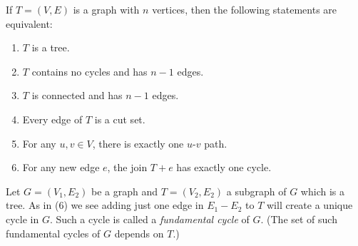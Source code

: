 \begin{theorem}
If $T = (V, E)$ is a graph with $n$ vertices, then the following
statements are equivalent:
\begin{enumerate}
\item $T$ is a tree.

\item $T$ contains no cycles and has $n - 1$ edges.

\item $T$ is connected and has $n - 1$ edges.

\item Every edge of $T$ is a cut set.

\item For any $u,v \in V$, there is exactly one $u$-$v$ path.

\item For any new edge $e$, the join $T + e$ has exactly one cycle.
\end{enumerate}
\end{theorem}

Let $G=(V_1,E_2)$ be a graph and $T=(V_2,E_2)$ a subgraph of $G$ which is a tree.
As in (6) we see adding just one edge in $E_1-E_2$ to $T$ will create a
unique cycle in $G$. Such a cycle is called a {\it fundamental cycle}
of $G$. (The set of such fundamental cycles of $G$ depends on $T$.)

